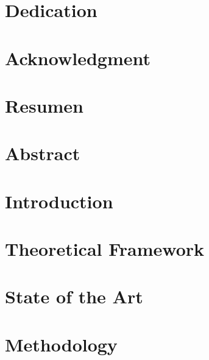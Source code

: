 \documentclass[12pt, twoside]{book}
\begin{document}
\chapter{\centering Dedication}
\label{chap:dedication}


\chapter{\centering Acknowledgment}
\label{chap:acknowledgments}


\chapter{\centering Resumen}
\label{chap:resumen}


\chapter{\centering Abstract}
\label{chap:abstract}


\tableofcontents 
\printglossaries
\listoftables
\listoffigures




\mainmatter

\newpage

\chapter{Introduction}
\label{chap:intro}


\chapter{Theoretical Framework}
\label{chap:theory}


\chapter{State of the Art}
\label{chap:state_of_art}


%

\chapter{Methodology}
\label{chap:methods}

\end{document}
